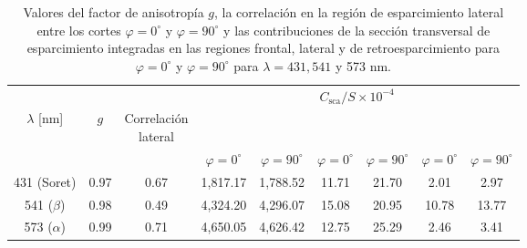 \begin{table}[htbp]
	\centering
	{
		\renewcommand{\arraystretch}{1.1}
		\setlength{\tabcolsep}{4pt}
		
		\begin{tabular}{ccccccccc}
			\hline
			\rowcolor{UNAMblue0!35!white}
			& & &
			\multicolumn{6}{c}{$C_{\text{sca}}/S\times 10^{-4}$}\\
			
			\rowcolor{UNAMblue0!35!white}
			$\lambda$ [nm] &
			$g$ &
			\shortstack[c]{Correlación\\lateral} &
			\multicolumn{2}{c}{\raisebox{0.6ex}{Frontal}} &
			\multicolumn{2}{c}{\raisebox{0.6ex}{Lateral}} &
			\multicolumn{2}{c}{\raisebox{0.6ex}{Posterior}}\\
			
			\rowcolor{UNAMblue0!35!white}
			& & &
			$\varphi=0^\circ$ & $\varphi=90^\circ$ &
			$\varphi=0^\circ$ & $\varphi=90^\circ$ &
			$\varphi=0^\circ$ & $\varphi=90^\circ$\\
			\hline
			
			\rowcolor{UNAMblue0!15!white}
			431 (Soret) & 0.97 & 0.67 &
			1,817.17 & 1,788.52 &
			11.71 & 21.70 & 2.01 & 2.97\\
			
			\rowcolor{UNAMblue0!5!white}
			541 ($\beta$) & 0.98 & 0.49 &
			4,324.20 & 4,296.07 &
			15.08 & 20.95 & 10.78 & 13.77\\
			
			\rowcolor{UNAMblue0!15!white}
			573 ($\alpha$) & 0.99 & 0.71 &
			4,650.05 & 4,626.42 &
			12.75 & 25.29 & 2.46 & 3.41\\
			\hline
		\end{tabular}
	}
	
	\caption{Valores del factor de anisotropía $g$, la correlación en la región de esparcimiento lateral entre los cortes $\varphi=0^\circ$ y $\varphi=90^\circ$ y las contribuciones de la sección transversal de esparcimiento integradas en las regiones frontal, lateral y de retroesparcimiento para $\varphi=0^\circ$ y $\varphi=90^\circ$ para $\lambda=431,541$ y 573 nm.}
	
	\label{table:val_eri}
\end{table}


